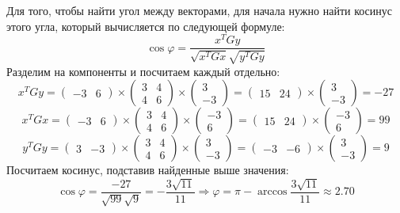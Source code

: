 \documentclass{article}
\begin{document}
\begin{center}
    Для того, чтобы найти угол между векторами, для начала нужно найти косинус этого угла, который вычисляется по следующей формуле:
    $$\cos\varphi = \frac{x^{T}Gy}{\sqrt{x^{T}Gx}\sqrt{y^{T}Gy}}$$
    Разделим на компоненты и посчитаем каждый отдельно:
    $$x^{T}Gy = \begin{pmatrix}
            -3 & 6
        \end{pmatrix}\times\begin{pmatrix}
            3 & 4 \\ 4 & 6
        \end{pmatrix}\times\begin{pmatrix}
            3 \\ -3
        \end{pmatrix} = \begin{pmatrix}
            15 & 24
        \end{pmatrix} \times \begin{pmatrix}
            3 \\ -3
        \end{pmatrix} = -27$$
    $$x^{T}Gx = \begin{pmatrix}
            -3 & 6
        \end{pmatrix}\times\begin{pmatrix}
            3 & 4 \\ 4 & 6
        \end{pmatrix}\times\begin{pmatrix}
            -3 \\ 6
        \end{pmatrix} = \begin{pmatrix}
            15 & 24
        \end{pmatrix} \times \begin{pmatrix}
            -3 \\ 6
        \end{pmatrix} = 99$$
    $$y^{T}Gy = \begin{pmatrix}
            3 & -3
        \end{pmatrix}\times\begin{pmatrix}
            3 & 4 \\ 4 & 6
        \end{pmatrix}\times\begin{pmatrix}
            3 \\ -3
        \end{pmatrix} = \begin{pmatrix}
            -3 & -6
        \end{pmatrix} \times \begin{pmatrix}
            3 \\ -3
        \end{pmatrix} = 9$$
    Посчитаем косинус, подставив найденные выше значения:
    $$\cos\varphi = \frac{-27}{\sqrt{99}\sqrt{9}} = -\frac{3\sqrt{11}}{11} \Rightarrow \varphi = \pi - \arccos\frac{3\sqrt{11}}{11} \approx 2.70$$
\end{center}
\end{document}
